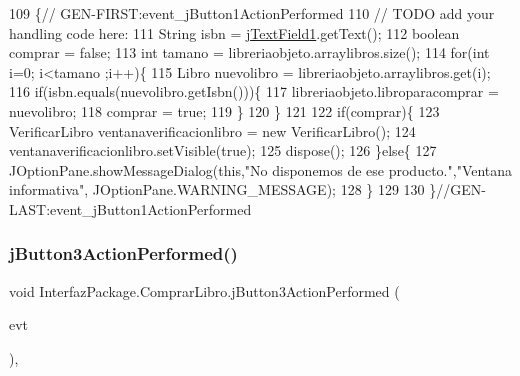 \begin{DoxyCode}
109                                                                          \{\textcolor{comment}{//
      GEN-FIRST:event\_jButton1ActionPerformed}
110         \textcolor{comment}{// TODO add your handling code here:}
111         String isbn = \mbox{\hyperlink{class_interfaz_package_1_1_comprar_libro_aefb13deeb30da3f6668b192b74c20705}{jTextField1}}.getText();
112         \textcolor{keywordtype}{boolean} comprar = \textcolor{keyword}{false};
113         \textcolor{keywordtype}{int} tamano = libreriaobjeto.arraylibros.size();
114         \textcolor{keywordflow}{for}(\textcolor{keywordtype}{int} i=0; i<tamano ;i++)\{
115             Libro nuevolibro = libreriaobjeto.arraylibros.get(i);
116             \textcolor{keywordflow}{if}(isbn.equals(nuevolibro.getIsbn()))\{
117                 libreriaobjeto.libroparacomprar = nuevolibro;
118                 comprar = \textcolor{keyword}{true};
119             \}
120         \}
121         
122         \textcolor{keywordflow}{if}(comprar)\{
123             VerificarLibro ventanaverificacionlibro = \textcolor{keyword}{new} VerificarLibro();
124             ventanaverificacionlibro.setVisible(\textcolor{keyword}{true});
125             dispose();
126         \}\textcolor{keywordflow}{else}\{
127             JOptionPane.showMessageDialog(\textcolor{keyword}{this},\textcolor{stringliteral}{"No disponemos de ese producto."},\textcolor{stringliteral}{"Ventana informativa"},
      JOptionPane.WARNING\_MESSAGE);
128         \}
129         
130     \}\textcolor{comment}{//GEN-LAST:event\_jButton1ActionPerformed}
\end{DoxyCode}
\mbox{\label{class_interfaz_package_1_1_comprar_libro_a27ea605530e2903b8f6b112e28f174af}} 
\subsubsection{\texorpdfstring{j\+Button3\+Action\+Performed()}{jButton3ActionPerformed()}}
{\footnotesize\ttfamily void Interfaz\+Package.\+Comprar\+Libro.\+j\+Button3\+Action\+Performed (\begin{DoxyParamCaption}\item[{java.\+awt.\+event.\+Action\+Event}]{evt }\end{DoxyParamCaption})\hspace{0.3cm}{\ttfamily [inline]}, {\ttfamily [private]}}


